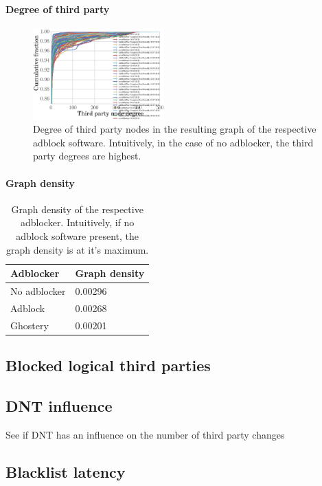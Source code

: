 \documentclass{sig-alternate}
\begin{document}
\paragraph{Degree of third party}
\begin{figure}[h]
  \centering
  \includegraphics[width=0.45\textwidth]{figures/degree_third_parties.eps}
  \caption{Degree of third party nodes in the resulting graph of the respective adblock software. Intuitively, in the case of no adblocker, the third party degrees are highest.}\label{fig:degree_third_parties}
\end{figure}
\paragraph{Graph density}

\begin{table}[htb!]
\centering
\begin{tabular}{l l }
\toprule
Adblocker & Graph density\\
\midrule
No adblocker & 0.00296\\
Adblock & 0.00268\\
Ghostery & 0.00201\\
\bottomrule
\end{tabular}
\caption{Graph density of the respective adblocker. Intuitively, if no adblock software present, the graph density is at it's maximum.}\label{tb:graph_density}
\end{table}

\subsection{Blocked logical third parties}
\subsection{DNT influence}
See if DNT has an influence on the number of third party changes
\subsection{Blacklist latency}
\end{document}
